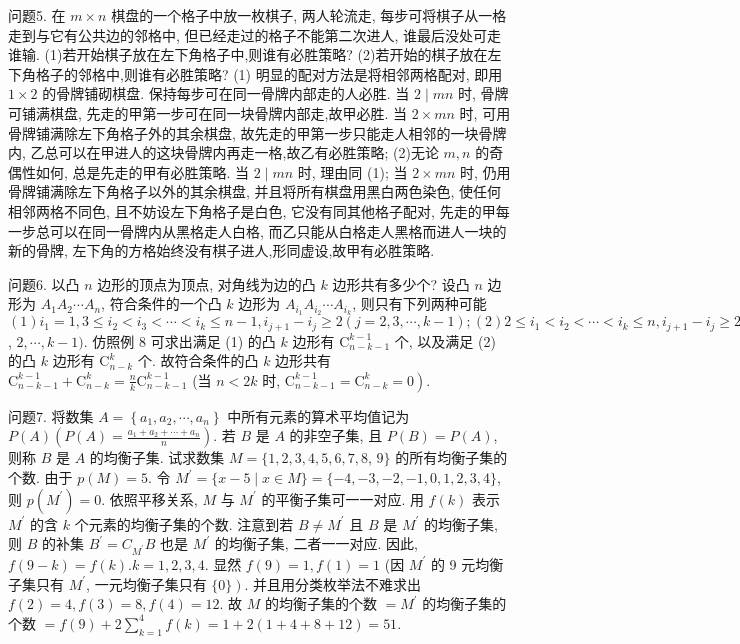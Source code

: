 问题5. 在 $m \times n$ 棋盘的一个格子中放一枚棋子, 两人轮流走, 每步可将棋子从一格走到与它有公共边的邻格中, 但已经走过的格子不能第二次进人, 谁最后没处可走谁输.
(1)若开始棋子放在左下角格子中,则谁有必胜策略?
(2)若开始的棋子放在左下角格子的邻格中,则谁有必胜策略?
(1) 明显的配对方法是将相邻两格配对, 即用 $1 \times 2$ 的骨牌铺砌棋盘.
保持每步可在同一骨牌内部走的人必胜.
当 $2 \mid m n$ 时, 骨牌可铺满棋盘, 先走的甲第一步可在同一块骨牌内部走,故甲必胜.
当 $2 \times m n$ 时, 可用骨牌铺满除左下角格子外的其余棋盘, 故先走的甲第一步只能走人相邻的一块骨牌内, 乙总可以在甲进人的这块骨牌内再走一格,故乙有必胜策略;
(2)无论 $m, n$ 的奇偶性如何, 总是先走的甲有必胜策略.
当 $2 \mid m n$ 时, 理由同 (1); 当 $2 \times m n$ 时, 仍用骨牌铺满除左下角格子以外的其余棋盘, 并且将所有棋盘用黑白两色染色, 使任何相邻两格不同色, 且不妨设左下角格子是白色, 它没有同其他格子配对, 先走的甲每一步总可以在同一骨牌内从黑格走人白格, 而乙只能从白格走人黑格而进人一块的新的骨牌, 左下角的方格始终没有棋子进人,形同虚设,故甲有必胜策略.



问题6. 以凸 $n$ 边形的顶点为顶点, 对角线为边的凸 $k$ 边形共有多少个?
设凸 $n$ 边形为 $A_1 A_2 \cdots A_n$, 符合条件的一个凸 $k$ 边形为 $A_{i_1} A_{i_2} \cdots A_{i_k}$, 则只有下列两种可能 $(1) i_1=1,3 \leqslant i_2<i_3<\cdots<i_k \leqslant n-1, i_{j+1}-i_j \geqslant 2(j=2,3, \cdots, k-1) ;(2) 2 \leqslant i_1<i_2<\cdots<i_k \leqslant n, i_{j+1}-i_j \geqslant 2(j=1$, $2, \cdots, k-1)$. 仿照例 8 可求出满足 (1) 的凸 $k$ 边形有 $\mathrm{C}_{n-k-1}^{k-1}$ 个, 以及满足 (2) 的凸 $k$ 边形有 $\mathrm{C}_{n-k}^k$ 个.
故符合条件的凸 $k$ 边形共有 $\mathrm{C}_{n-k-1}^{k-1}+\mathrm{C}_{n-k}^k=\frac{n}{k} \mathrm{C}_{n-k-1}^{k-1}$ (当 $n<2 k$ 时, $\left.\mathrm{C}_{n-k-1}^{k-1}=\mathrm{C}_{n-k}^k=0\right)$.



问题7. 将数集 $A=\left\{a_1, a_2, \cdots, a_n\right\}$ 中所有元素的算术平均值记为 $P(A)\left(P(A)=\frac{a_1+a_2+\cdots+a_n}{n}\right)$. 若 $B$ 是 $A$ 的非空子集, 且 $P(B)= P(A)$, 则称 $B$ 是 $A$ 的均衡子集.
试求数集 $M=\{1,2,3,4,5,6,7,8$, $9\}$ 的所有均衡子集的个数.
由于 $p(M)=5$. 令 $M^{\prime}=\{x-5 \mid x \in M\}=\{-4,-3,-2,-1,0,1,2,3,4\}$, 则 $p\left(M^{\prime}\right)=0$. 依照平移关系, $M$ 与 $M^{\prime}$ 的平衡子集可一一对应.
用 $f(k)$ 表示 $M^{\prime}$ 的含 $k$ 个元素的均衡子集的个数.
注意到若 $B \neq M^{\prime}$ 且 $B$ 是 $M^{\prime}$ 的均衡子集, 则 $B$ 的补集 $B^{\prime}=C_{M^{\prime}} B$ 也是 $M^{\prime}$ 的均衡子集, 二者一一对应.
因此, $f(9-k)=f(k) . k=1,2,3,4$. 显然 $f(9)=1, f(1)=1$ (因 $M^{\prime}$ 的 9 元均衡子集只有 $M^{\prime}$, 一元均衡子集只有 $\left.\{0\}\right)$. 并且用分类枚举法不难求出 $f(2)=4, f(3)=8, f(4)=12$. 故 $M$ 的均衡子集的个数 $=M^{\prime}$ 的均衡子集的个数 $=f(9)+2 \sum_{k=1}^4 f(k)=1+2(1+4+8+12)=51$.



